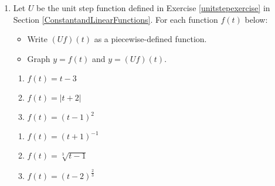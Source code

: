\begin{enumerate}
\setcounter{enumi}{\value{HW}}

\item  Let $U$ be the unit step function defined in Exercise \ref{unitstepexercise} in Section \ref{ConstantandLinearFunctions}.  For each function $f(t)$ below:

\begin{itemize}

\item  Write $(Uf)(t)$ as a piecewise-defined function.

\item  Graph $y = f(t)$ and $y = (Uf)(t)$.

\end{itemize}

\begin{multicols}{3}

\begin{enumerate}

\item $f(t) = t-3$



\item  $f(t) = |t+2|$



\item  $f(t) =(t-1)^2$



\setcounter{HW}{\value{enumii}}

\end{enumerate}

\end{multicols}

\begin{multicols}{3}

\begin{enumerate}

\setcounter{enumii}{\value{HW}}

\item  $f(t) =(t+1)^{-1}$



\item  $f(t) = \sqrt[3]{t-1}$ 



\item  $f(t) = (t-2)^{\frac{2}{3}}$ 



\setcounter{HW}{\value{enumii}}

\end{enumerate}


\end{multicols}
\end{enumerate}
